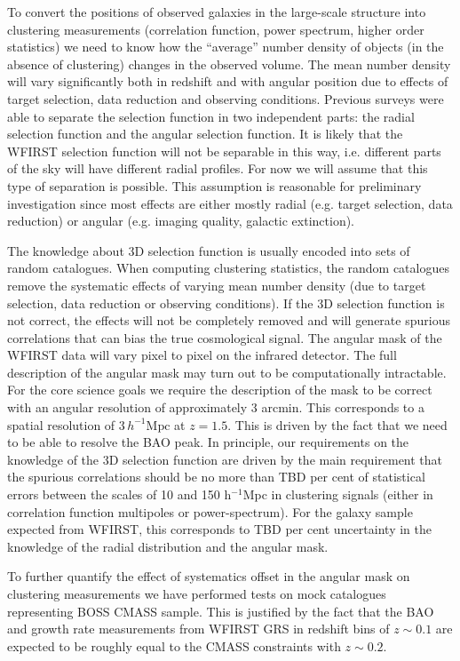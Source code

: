  To convert the positions of observed galaxies in the large-scale structure
 into clustering measurements (correlation function, power spectrum, higher order
 statistics) we need to know how the ``average'' number density of objects (in the
 absence of clustering) changes in the observed volume. The mean number density
 will vary significantly both in redshift and with angular position due to
 effects of target selection, data reduction and observing conditions. Previous
 surveys were able to separate the selection function in two independent parts:
 the radial selection function and the angular selection function. It is likely
 that the WFIRST selection function will not be separable in this way, i.e.
 different parts of the sky will have different radial profiles. For now we will
 assume that this type of separation is possible. This assumption is reasonable
 for preliminary investigation since most effects are either mostly radial (e.g.
 target selection, data reduction) or angular (e.g. imaging quality, galactic
 extinction).

 The knowledge about 3D selection function is usually encoded into sets of random
 catalogues. When computing clustering statistics, the random catalogues remove
 the systematic effects of varying mean number density (due to target selection,
 data reduction or observing conditions). If the 3D selection function is not
 correct, the effects will not be completely removed and will generate spurious
 correlations that can bias the true cosmological signal. The angular mask of the
 WFIRST data will vary pixel to pixel on the infrared detector. The full
 description of the angular mask may turn out to be computationally intractable.
 For the core science goals we require the description of the mask to be correct
 with an angular resolution of approximately 3 arcmin. This corresponds to a
 spatial resolution of $3 \,h^{-1} \mathrm{Mpc}$ at $z=1.5$. This is driven by the fact that we
 need to be  able to resolve the BAO peak. In principle, our requirements on the
 knowledge of the 3D selection function are driven by the main requirement that
 the spurious correlations should be no more than TBD per cent of statistical
 errors between the scales of 10 and 150 h$^{-1}$Mpc in clustering signals (either
 in correlation function multipoles or power-­spectrum). For the galaxy sample
 expected from WFIRST, this corresponds to TBD per cent uncertainty in the
 knowledge of the radial distribution and the angular mask.

 To further quantify the effect of systematics offset in the angular mask on
 clustering measurements we have performed tests on mock catalogues representing
 BOSS CMASS sample. This is justified by the fact that the BAO and growth rate
 measurements from WFIRST GRS in redshift bins of $z\sim0.1$ are expected to be
 roughly equal to the CMASS constraints with $z\sim0.2$.

